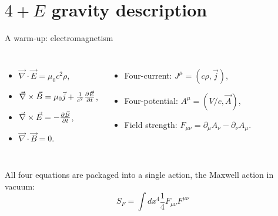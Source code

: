 \documentclass{beamer}
\begin{document}
\section{$4+E$ gravity description}
\begin{frame}{A warm-up: electromagnetism}
    \begin{columns}
        \begin{itemize}
            \item $\vec{\nabla} \cdot \vec{E} = \mu_0 c^2 \rho$,
            \item $\vec{\nabla} \times \vec{B} = \mu_0 \vec{j} + \frac{1}{c^2} \pdv{\vec{E}}{t}$,
            \item $\vec{\nabla} \times \vec{E} = - \pdv{\vec{B}}{t}$,
            \item $\vec{\nabla} \cdot \vec{B} = 0$.
        \end{itemize}
        \pause
        \begin{itemize}
        \item Four-current: $J^\mu = (c \rho , \vec{j})$, \\
        \item Four-potential: $A^\mu = (V/c, \vec{A})$,
        \item Field strength: $F_{\mu \nu} = \partial_\mu A_\nu - \partial_\nu A_\mu$.\\
        \end{itemize}
        \vspace{6mm}\pause
    \end{columns}
    \vspace{10mm}
All four equations are packaged into a single action, the Maxwell action in vacuum:
\begin{equation*}
    \boxed{S_{F} = \int dx^4 \frac{1}{4} F_{\mu \nu}F^{\mu \nu}}
\end{equation*}
\end{frame}
\end{document}
